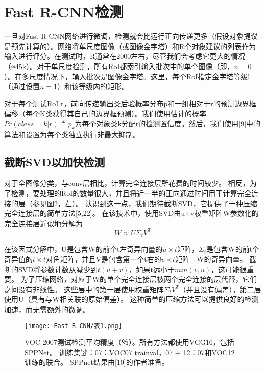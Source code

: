 \section{Fast R-CNN检测}
\par 一旦对Fast R-CNN网络进行微调，检测就会比运行正向传递更多（假设对象提议是预先计算的）。网络将单尺度图像（或图像金字塔）和R个对象建议的列表作为输入进行评分。在测试时，R通常在2000左右，尽管我们会考虑它更大的情况（≈45k）。对于单尺度检测，所有RoI都索引输入批次中的单个图像（即，$n=0$）。在多尺度情况下，输入批次是图像金字塔。这里，每个RoI指定金字塔等级l（通过设置$n=1$）和该等级内的矩形。
\par 对于每个测试RoI r，前向传递输出类后验概率分布p和一组相对于r的预测边界框偏移（每个K类获得其自己的边界框预测）。我们使用估计的概率$Pr(class=k|r)\triangleq p_k$为每个对象类k分配r的检测置信度。然后，我们使用[9]中的算法和设置为每个类独立执行非最大抑制。

\subsection{截断SVD以加快检测}
\par 对于全图像分类，与conv层相比，计算完全连接层所花费的时间较少。 相反，为了检测，要处理的RoI的数量很大，并且将近一半的正向通过时间用于计算完全连接的层（参见图2，左）。 认识到这一点，我们期待截断SVD，它提供了一种压缩完全连接层的简单方法[5,22]。 在该技术中，使用SVD由u×v权重矩阵W参数化的完全连接层近似地分解为
\begin{equation}
    W\approx U\Sigma_tV^T
\end{equation}
\par 在该因式分解中，U是包含W的前个t左奇异向量的$u\times t$矩阵，$\Sigma_t$是包含W的前t个奇异值的$t\times t$对角矩阵，并且V是包含第一个t右的$v \times t$矩阵 - W的奇异向量。 截断的SVD将参数计数从减少到$t(u+v)$，如果t远小于$min(v,u)$，这可能很重要。 为了压缩网络，对应于W的单个完全连接层被两个完全连接的层代替，它们之间没有非线性。 这些层中的第一层使用权重矩阵$\Sigma_tV^T$（并且没有偏差），第二层使用U（具有与W相关联的原始偏差）。 这种简单的压缩方法可以提供良好的检测加速，而无需额外的微调。

\begin{figure}[h]
    \centering
    \texttt{[image: Fast R-CNN/表1.png]}
    \caption{VOC 2007测试检测平均精度（％）。所有方法都使用VGG16，包括SPPNet。 训练集键：07：VOC07 trainval，07 + 12：07和VOC12训练的联合。 SPPnet结果由[10]的作者准备。}
    \label{表1}
\end{figure}


